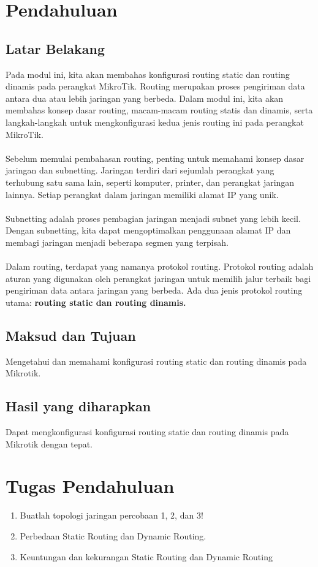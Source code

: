 \section{Pendahuluan}
\subsection{Latar Belakang}
Pada modul ini, kita akan membahas konfigurasi routing static dan routing dinamis pada perangkat
MikroTik. Routing merupakan proses pengiriman data antara dua atau lebih jaringan yang berbeda.
Dalam modul ini, kita akan membahas konsep dasar routing, macam-macam routing statis dan
dinamis, serta langkah-langkah untuk mengkonfigurasi kedua jenis routing ini pada perangkat
MikroTik.\\\\
Sebelum memulai pembahasan routing, penting untuk memahami konsep dasar jaringan dan
subnetting. Jaringan terdiri dari sejumlah perangkat yang terhubung satu sama lain, seperti komputer,
printer, dan perangkat jaringan lainnya. Setiap perangkat dalam jaringan memiliki alamat IP yang
unik.\\\\
Subnetting adalah proses pembagian jaringan menjadi subnet yang lebih kecil. Dengan subnetting, kita
dapat mengoptimalkan penggunaan alamat IP dan membagi jaringan menjadi beberapa segmen yang
terpisah.\\\\
Dalam routing, terdapat yang namanya protokol routing. Protokol routing adalah aturan yang
digunakan oleh perangkat jaringan untuk memilih jalur terbaik bagi pengiriman data antara jaringan
yang berbeda. Ada dua jenis protokol routing utama: \textbf{routing static dan routing dinamis.}

\subsection{Maksud dan Tujuan}
Mengetahui dan memahami konfigurasi routing static dan routing dinamis pada Mikrotik.

\subsection{Hasil yang diharapkan}
Dapat mengkonfigurasi konfigurasi routing static dan routing dinamis pada Mikrotik dengan
tepat.

\section{Tugas Pendahuluan}
\begin{enumerate}
	\item Buatlah topologi jaringan percobaan 1, 2, dan 3!
	\item Perbedaan Static Routing dan Dynamic Routing.
	\item Keuntungan dan kekurangan Static Routing dan Dynamic Routing
\end{enumerate}

